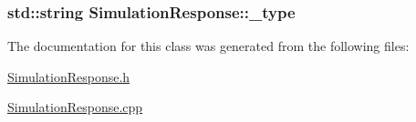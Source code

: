 \subsubsection[{\texorpdfstring{\+\_\+type}{_type}}]{\setlength{\rightskip}{0pt plus 5cm}std\+::string Simulation\+Response\+::\+\_\+type\hspace{0.3cm}{\ttfamily [protected]}}\hypertarget{class_simulation_response_af62ba9398deece20fd91dc29e2a79880}{}\label{class_simulation_response_af62ba9398deece20fd91dc29e2a79880}


The documentation for this class was generated from the following files\+:\begin{DoxyCompactItemize}
\item 
\hyperlink{_simulation_response_8h}{Simulation\+Response.\+h}\item 
\hyperlink{_simulation_response_8cpp}{Simulation\+Response.\+cpp}\end{DoxyCompactItemize}
